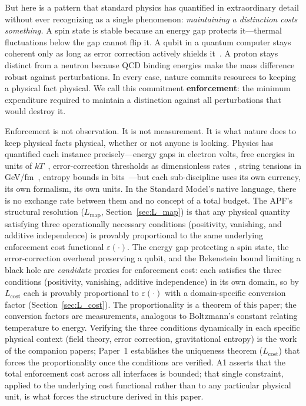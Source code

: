 \documentclass[11pt]{article}
\theoremstyle{remark}
\begin{document}
But here is a pattern that standard physics has quantified in extraordinary detail without ever recognizing as a single phenomenon: \emph{maintaining a distinction costs something.}  A spin state is stable because an energy gap protects it---thermal fluctuations below the gap cannot flip it.  A qubit in a quantum computer stays coherent only as long as error correction actively shields it~\cite{NielsenChuang2000}.  A proton stays distinct from a neutron because QCD binding energies make the mass difference robust against perturbations.  In every case, nature commits resources to keeping a physical fact physical.  We call this commitment \textbf{enforcement}: the minimum expenditure required to maintain a distinction against all perturbations that would destroy it.

Enforcement is not observation.  It is not measurement.  It is what nature does to keep physical facts physical, whether or not anyone is looking.  Physics has quantified each instance precisely---energy gaps in electron volts, free energies in units of $kT$~\cite{Jaynes1957}, error-correction thresholds as dimensionless rates~\cite{NielsenChuang2000}, string tensions in GeV/fm~\cite{Wilson1974}, entropy bounds in bits~\cite{Bekenstein1981}---but each sub-discipline uses its own currency, its own formalism, its own units.  In the Standard Model's native language, there is no exchange rate between them and no concept of a total budget.  The APF's structural resolution ($L_{\mathrm{map}}$, Section~\ref{sec:L_map}) is that any physical quantity satisfying three operationally necessary conditions (positivity, vanishing, and additive independence) is provably proportional to the same underlying enforcement cost functional $\varepsilon(\cdot)$.  The energy gap protecting a spin state, the error-correction overhead preserving a qubit, and the Bekenstein bound limiting a black hole are \emph{candidate} proxies for enforcement cost: each satisfies the three conditions (positivity, vanishing, additive independence) in its own domain, so by $L_{\mathrm{cost}}$ each is provably proportional to $\varepsilon(\cdot)$ with a domain-specific conversion factor (Section~\ref{sec:L_cost}).  The proportionality is a theorem of this paper; the conversion factors are measurements, analogous to Boltzmann's constant relating temperature to energy.  Verifying the three conditions dynamically in each specific physical context (field theory, error correction, gravitational entropy) is the work of the companion papers; Paper~1 establishes the uniqueness theorem ($L_{\mathrm{cost}}$) that forces the proportionality once the conditions are verified.  A1 asserts that the total enforcement cost across all interfaces is bounded; that single constraint, applied to the underlying cost functional rather than to any particular physical unit, is what forces the structure derived in this paper.
\end{document}
